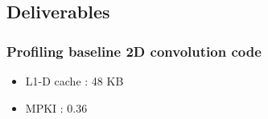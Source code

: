 \documentclass[11pt,a4paper]{article}
\begin{document}
\subsection{Deliverables}

\subsubsection{Profiling baseline 2D convolution code}
\begin{itemize}
    \item L1-D cache : 48 KB
    \item MPKI : 0.36
\end{itemize}
\end{document}
